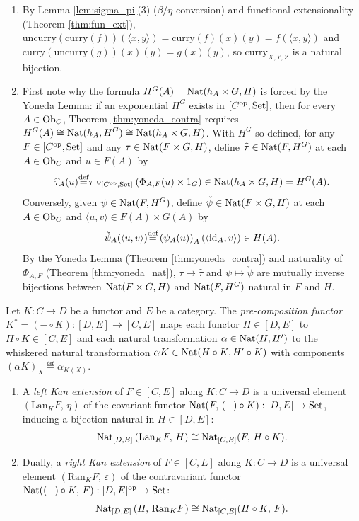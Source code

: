 \documentclass[10pt,a4paper]{article}
\begin{document}
\begin{enumerate}
\item By Lemma \ref{lem:sigma_pi}(3) ($\beta/\eta$-conversion) and functional extensionality (Theorem \ref{thm:fun_ext}), $\mathrm{uncurry}(\mathrm{curry}(f))(\langle x,y \rangle) = \mathrm{curry}(f)(x)(y) = f(\langle x,y \rangle)$ and $\mathrm{curry}(\mathrm{uncurry}(g))(x)(y) = g(x)(y)$, so $\mathrm{curry}_{X,Y,Z}$ is a natural bijection.
\item First note why the formula $H^G(A) = {\textrm{Nat}}(h_A \times G, H)$ is forced by the Yoneda Lemma: if an exponential $H^G$ exists in $[C^{\textrm{op}}, {\textrm{Set}}]$, then for every $A \in {\textrm{Ob}}_C$, Theorem \ref{thm:yoneda_contra} requires $H^G(A) \cong {\textrm{Nat}}(h_A, H^G) \cong {\textrm{Nat}}(h_A \times G, H)$. With $H^G$ so defined, for any $F \in [C^{\textrm{op}}, {\textrm{Set}}]$ and any $\tau \in {\textrm{Nat}}(F \times G, H)$, define $\widehat{\tau} \in {\textrm{Nat}}(F, H^G)$ at each $A \in {\textrm{Ob}}_C$ and $u \in F(A)$ by
$$\widehat{\tau}_A(u) {\stackrel{{\textrm{def}}}{=}} \tau \circ_{[C^{\textrm{op}},{\textrm{Set}}]} \left(\Phi_{A,F}(u) \times 1_G\right) \in {\textrm{Nat}}(h_A \times G, H) = H^G(A).$$
Conversely, given $\psi \in {\textrm{Nat}}(F, H^G)$, define $\check{\psi} \in {\textrm{Nat}}(F \times G, H)$ at each $A \in {\textrm{Ob}}_C$ and $\langle u, v \rangle \in F(A) \times G(A)$ by
$$\check{\psi}_A(\langle u, v \rangle) {\stackrel{{\textrm{def}}}{=}} \left(\psi_A(u)\right)_A(\langle {\textrm{id}}_A, v \rangle) \in H(A).$$
By the Yoneda Lemma (Theorem \ref{thm:yoneda_contra}) and naturality of $\Phi_{A,F}$ (Theorem \ref{thm:yoneda_nat}), $\tau \mapsto \widehat{\tau}$ and $\psi \mapsto \check{\psi}$ are mutually inverse bijections between ${\textrm{Nat}}(F \times G, H)$ and ${\textrm{Nat}}(F, H^G)$ natural in $F$ and $H$.
\end{enumerate}
\myqed

\begin{definition}\label{def:kan_ext}
Let $K : C \to D$ be a functor and $E$ be a category. The \emph{pre-composition functor} $K^* = (- \circ K) : [D, E] \to [C, E]$ maps each functor $H \in [D, E]$ to $H \circ K \in [C, E]$ and each natural transformation $\alpha \in {\textrm{Nat}}(H, H')$ to the whiskered natural transformation $\alpha K \in {\textrm{Nat}}(H \circ K, H' \circ K)$ with components $(\alpha K)_X \eqdef \alpha_{K(X)}$.
\begin{enumerate}
\item A \emph{left Kan extension} of $F \in [C, E]$ along $K : C \to D$ is a universal element $(\mathrm{Lan}_K F,\, \eta)$ of the covariant functor ${\textrm{Nat}}(F,\, (-) \circ K) : [D, E] \to {\textrm{Set}}$, inducing a bijection natural in $H \in [D, E]$:
$${\textrm{Nat}}_{[D,E]}\left(\mathrm{Lan}_K F,\, H\right) \cong {\textrm{Nat}}_{[C,E]}(F,\, H \circ K).$$
\item Dually, a \emph{right Kan extension} of $F \in [C, E]$ along $K : C \to D$ is a universal element $(\mathrm{Ran}_K F,\, \varepsilon)$ of the contravariant functor ${\textrm{Nat}}((-) \circ K,\, F) : [D, E]^{\textrm{op}} \to {\textrm{Set}}$:
$${\textrm{Nat}}_{[D,E]}\left(H,\, \mathrm{Ran}_K F\right) \cong {\textrm{Nat}}_{[C,E]}(H \circ K,\, F).$$
\end{enumerate}
\end{definition}
\end{document}
